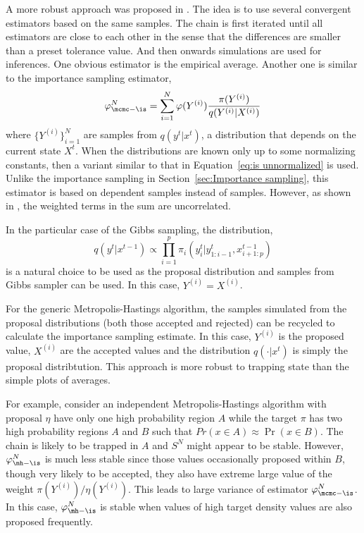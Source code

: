 

A more robust approach was proposed in \cite{Robert:1995ge}. The idea is to
use several convergent estimators based on the same samples. The chain is
first iterated until all estimators are close to each other in the sense that
the differences are smaller than a preset tolerance value. And then onwards
simulations are used for inferences. One obvious estimator is the empirical
average. Another one is similar to the importance sampling estimator,
\begin{equation}
  \varphi_{\mcmc-\is}^N
  = \sum_{i=1}^N \varphi(Y^{(i)})\frac{\pi(Y^{(i)})}{q(Y^{(i)}|X^{(i)})}
  \label{eq:sn is}
\end{equation}
where $\{Y^{(i)}\}_{i=1}^N$ are samples from $q(y^t|x^t)$, a distribution
that depends on the current state $X^t$. When the distributions are known
only up to some normalizing constants, then a variant similar to that in
Equation~\eqref{eq:is unnormalized} is used. Unlike the importance sampling
in Section~\ref{sec:Importance sampling}, this estimator is based on
dependent samples instead of \iid samples. However, as shown in
\cite[][Lemma~12.11]{Robert:2004tn}, the weighted terms in the sum are
uncorrelated.


In the particular case of the Gibbs sampling, the distribution,
\begin{equation}
  q(y^t|x^{t-1}) \propto
  \prod_{i=1}^p \pi_i(y_i^t|y_{1:i-1}^t,x_{i+1:p}^{t-1})
\end{equation}
is a natural choice to be used as the proposal distribution and samples from
Gibbs sampler can be used. In this case, $Y^{(i)} = X^{(i)}$.

For the generic Metropolis-Hastings algorithm, the samples simulated from the
proposal distributions (both those accepted and rejected) can be recycled to
calculate the importance sampling estimate. In this case, $Y^{(i)}$ is the
proposed value, $X^{(i)}$ are the accepted values and the distribution
$q(\cdot|x^t)$ is simply the proposal distribtution. This approach is more
robust to trapping state than the simple plots of averages.

For example, consider an independent Metropolis-Hastings algorithm with
proposal $\eta$ have only one high probability region $A$ while the target
$\pi$ has two high probability regions $A$ and $B$ such that $Pr(x\in
A)\approx\Pr(x\in B)$. The chain is likely to be trapped in $A$ and $S^N$
might appear to be stable. However, $\varphi_{\mh-\is}^N$ is much less stable
since those values occasionally proposed within $B$, though very likely to be
accepted, they also have extreme large value of the weight
$\pi(Y^{(i)})/\eta(Y^{(i)})$. This leads to large variance of estimator
$\varphi_{\mcmc-\is}^N$. In this case, $\varphi_{\mh-\is}^N$ is stable when
values of high target density values are also proposed frequently.

